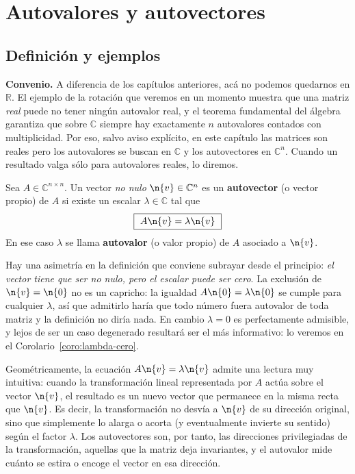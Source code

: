 
\chapter{Autovalores y autovectores}\label{cap:autovalores}

\section{Definición y ejemplos}

\noindent\textbf{Convenio.} A diferencia de los capítulos anteriores, acá no podemos
quedarnos en $\mathbb{R}$. El ejemplo de la rotación que veremos en un momento muestra que
una matriz \emph{real} puede no tener ningún autovalor real, y el teorema fundamental del
álgebra garantiza que sobre $\mathbb{C}$ siempre hay exactamente $n$ autovalores contados
con multiplicidad. Por eso, salvo aviso explícito, en este capítulo las matrices son
reales pero los autovalores se buscan en $\mathbb{C}$ y los autovectores en $\mathbb{C}^n$.
Cuando un resultado valga sólo para autovalores reales, lo diremos.

\medskip

\begin{definicion}\label{def:autovalor}
Sea $A\in\mathbb{C}^{n\times n}$. Un vector \emph{no nulo} $\n{v}\in\mathbb{C}^n$ es un
\textbf{autovector} (o vector propio) de $A$ si existe un escalar
$\lambda\in\mathbb{C}$ tal que
\[
\boxed{\ A\n{v}=\lambda\n{v}\ }
\]
En ese caso $\lambda$ se llama \textbf{autovalor} (o valor propio) de $A$ asociado a
$\n{v}$.
\end{definicion}

Hay una asimetría en la definición que conviene subrayar desde el principio: \emph{el
vector tiene que ser no nulo, pero el escalar puede ser cero}. La exclusión de
$\n{v}=\n{0}$ no es un capricho: la igualdad $A\n{0}=\lambda\n{0}$ se cumple para
cualquier $\lambda$, así que admitirlo haría que todo número fuera autovalor de toda
matriz y la definición no diría nada. En cambio $\lambda=0$ es perfectamente admisible,
y lejos de ser un caso degenerado resultará ser el más informativo: lo veremos en el
Corolario~\ref{coro:lambda-cero}.



Geométricamente, la ecuación $A\n{v} = \lambda \n{v}$ admite una lectura muy intuitiva: cuando la transformación lineal representada por $A$ actúa sobre el vector $\n{v}$, el resultado es un nuevo vector que permanece en la misma recta que $\n{v}$. Es decir, la transformación no desvía a $\n{v}$ de su dirección original, sino que simplemente lo alarga o acorta (y eventualmente invierte su sentido) según el factor $\lambda$. Los autovectores son, por tanto, las direcciones privilegiadas de la transformación, aquellas que la matriz deja invariantes, y el autovalor mide cuánto se estira o encoge el vector en esa dirección.


